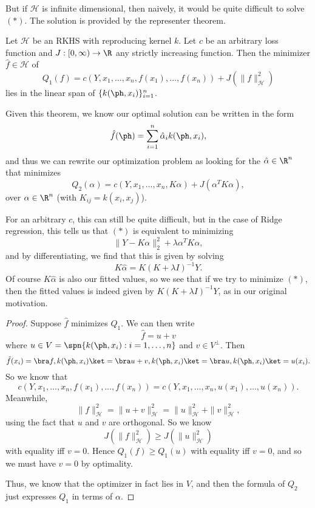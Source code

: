 \documentclass[a4paper]{article}
\begin{document}
But if $\mathcal{H}$ is infinite dimensional, then naively, it would be quite difficult to solve $(*)$. The solution is provided by the representer theorem.

\begin{thm}
  Let $\mathcal{H}$ be an RKHS with reproducing kernel $k$. Let $c$ be an arbitrary loss function and $J: [0, \infty) \to \R$ any strictly increasing function. Then the minimizer $\hat{f} \in \mathcal{H}$ of
  \[
    Q_1(f) = c(Y, x_1, \ldots, x_n, f(x_1), \ldots, f(x_n)) + J(\|f\|_{\mathcal{H}}^2)
  \]
  lies in the linear span of $\{k(\ph, x_i)\}_{i = 1}^n$.
\end{thm}

Given this theorem, we know our optimal solution can be written in the form
\[
  \hat{f}(\ph) = \sum_{i = 1}^n \hat{\alpha}_i k(\ph, x_i),
\]
and thus we can rewrite our optimization problem as looking for the $\hat{\alpha} \in \R^n$ that minimizes
\[
  Q_2(\alpha) = c(Y, x_1, \ldots, x_n, K\alpha) + J(\alpha^T K \alpha),
\]
over $\alpha \in \R^n$ (with $K_{ij} = k(x_i, x_j)$).

For an arbitrary $c$, this can still be quite difficult, but in the case of Ridge regression, this tells us that $(*)$ is equivalent to minimizing
\[
  \|Y - K\alpha\|_2^2 + \lambda \alpha^T K \alpha,
\]
and by differentiating, we find that this is given by solving
\[
  K \hat{\alpha} = K(K + \lambda I)^{-1} Y.
\]
Of course $K\hat{\alpha}$ is also our fitted values, so we see that if we try to minimize $(*)$, then the fitted values is indeed given by $K(K + \lambda I)^{-1}Y$, as in our original motivation.

\begin{proof}
  Suppose $\hat{f}$ minimizes $Q_1$. We can then write
  \[
    \hat{f} = u + v
  \]
  where $u \in V = \spn\{k(\ph, x_i): i = 1, \ldots ,n\}$ and $v \in V^\perp$. Then
  \[
    \hat{f}(x_i) = \bra f, k(\ph, x_i)\ket = \bra u + v, k(\ph, x_i)\ket = \bra u, k(\ph, x_i)\ket = u(x_i).
  \]
  So we know that
  \[
    c(Y, x_1, \ldots, x_n, f(x_1), \ldots, f(x_n)) = c(Y, x_1, \ldots, x_n, u(x_1), \ldots, u(x_n)).
  \]
  Meanwhile,
  \[
    \|f\|^2_{\mathcal{H}} = \|u + v\|^2_{\mathcal{H}} = \|u\|^2_{\mathcal{H}} + \|v\|^2_{\mathcal{H}},
  \]
  using the fact that $u$ and $v$ are orthogonal. So we know
  \[
    J(\|f\|_{\mathcal{H}}^2 ) \geq J(\|u\|_{\mathcal{H}}^2)
  \]
  with equality iff $v = 0$. Hence $Q_1(f) \geq Q_1(u)$ with equality iff $v = 0$, and so we must have $v = 0$ by optimality.

  Thus, we know that the optimizer in fact lies in $V$, and then the formula of $Q_2$ just expresses $Q_1$ in terms of $\alpha$.
\end{proof}
\end{document}
